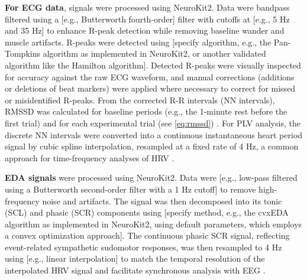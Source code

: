 \textbf{For \gls{ECG} data}, signals were processed using NeuroKit2. Data were bandpass filtered using a [e.g., Butterworth fourth-order] filter with cutoffs at [e.g., 5 Hz and 35 Hz] to enhance R-peak detection while removing baseline wander and muscle artifacts. R-peaks were detected using [specify algorithm, e.g., the Pan-Tompkins algorithm \parencite{panRealTimeQRSDetection1985} as implemented in NeuroKit2, or another validated algorithm like the Hamilton algorithm]. Detected R-peaks were visually inspected for accuracy against the raw \gls{ECG} waveform, and manual corrections (additions or deletions of beat markers) were applied where necessary to correct for missed or misidentified R-peaks. From the corrected R-R intervals (\gls{NN intervals}), \gls{RMSSD} was calculated for baseline periods (e.g., the 1-minute rest before the first trial) and for each experimental trial (see \autoref{eq:rmssd}) \parencite{malikHeartRateVariability1996}. For \gls{PLV} analysis, the discrete \gls{NN intervals} were converted into a continuous instantaneous heart period signal by cubic spline interpolation, resampled at a fixed rate of 4 Hz, a common approach for time-frequency analyses of \gls{HRV} \parencite{lagunaPowerSpectralDensity1998}.

\textbf{\gls{EDA} signals} were processed using NeuroKit2. Data were [e.g., low-pass filtered using a Butterworth second-order filter with a 1 Hz cutoff] to remove high-frequency noise and artifacts. The signal was then decomposed into its tonic (\gls{SCL}) and phasic (\gls{SCR}) components using [specify method, e.g., the cvxEDA algorithm \parencite{benedekDecompositionSkinConductance2010} as implemented in NeuroKit2, using default parameters, which employs a convex optimization approach]. The continuous phasic \gls{SCR} signal, reflecting event-related sympathetic sudomotor responses, was then resampled to 4 Hz using [e.g., linear interpolation] to match the temporal resolution of the interpolated \gls{HRV} signal and facilitate synchronous analysis with \gls{EEG} \parencite{boucseinElectrodermalActivity2012}.

